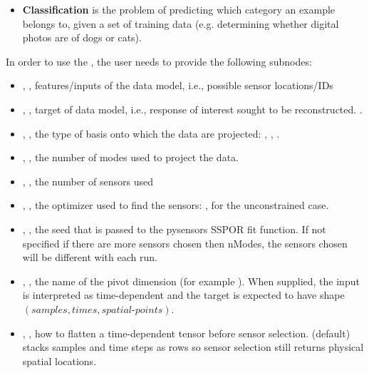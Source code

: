\begin{itemize}
\begin{itemize}
    \item \textbf{Classification} is the problem of predicting which category an example belongs to, given a set of training data (e.g. determining whether digital photos are of dogs or cats).
\end{itemize}
In order to use the , the user needs to provide the following subnodes:
\begin{itemize}
	\item {}, , features/inputs of the data model, i.e., possible sensor locations/IDs
	\item {}, , target of data model, i.e., response of interest sought to be reconstructed.
  .
	\item {} , , the type of basis onto which the data are projected: , , . 
	\item {},  , the number of modes  used to project the data.
	\item {},  , the number of sensors used
	\item {},  , the optimizer used to find the sensors: , for the unconstrained case.
        \item {}, , the seed that is passed to the pysensors SSPOR fit function.  If not specified if there are more sensors chosen then nModes, the sensors chosen will be different with each run.
        \item {}, , the name of the pivot dimension (for example ). When supplied, the input is interpreted as time-dependent and the target is expected to have shape $(samples, times, spatial\text{-}points)$.
        \item {}, , how to flatten a time-dependent tensor before sensor selection.  (default) stacks samples and time steps as rows so sensor selection still returns physical spatial locations.
\end{itemize}
\end{itemize}

